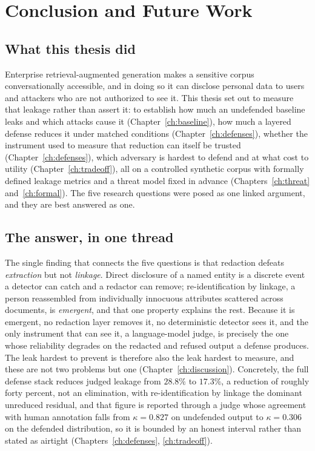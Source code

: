 \chapter{Conclusion and Future Work}
\label{ch:conclusion}

\section{What this thesis did}
\label{sec:concl-summary}

Enterprise retrieval-augmented generation makes a sensitive corpus conversationally accessible,
and in doing so it can disclose personal data to users and attackers who are not authorized to
see it. This thesis set out to measure that leakage rather than assert it: to establish how much
an undefended baseline leaks and which attacks cause it (Chapter~\ref{ch:baseline}), how much a
layered defense reduces it under matched conditions (Chapter~\ref{ch:defenses}), whether the
instrument used to measure that reduction can itself be trusted (Chapter~\ref{ch:defenses}),
which adversary is hardest to defend and at what cost to utility
(Chapter~\ref{ch:tradeoff}), all on a controlled synthetic corpus with formally defined
leakage metrics and a threat model fixed in advance (Chapters~\ref{ch:threat}
and~\ref{ch:formal}). The five research
questions were posed as one linked argument, and they are best answered as one.

\section{The answer, in one thread}
\label{sec:concl-answer}

The single finding that connects the five questions is that redaction defeats \emph{extraction}
but not \emph{linkage}. Direct disclosure of a named entity is a discrete event a detector can
catch and a redactor can remove; re-identification by linkage, a person reassembled from
individually innocuous attributes scattered across documents, is \emph{emergent}, and that one
property explains the rest. Because it is emergent, no redaction layer removes it, no
deterministic detector sees it, and the only instrument that can see it, a language-model judge,
is precisely the one whose reliability degrades on the redacted and refused output a defense
produces. The leak hardest to prevent is therefore also the leak hardest to measure, and these
are not two problems but one (Chapter~\ref{ch:discussion}). Concretely, the full defense stack
reduces judged leakage from $28.8\%$ to $17.3\%$, a reduction of roughly forty percent, not an
elimination, with re-identification by linkage the dominant unreduced residual, and that
figure is reported through a judge whose agreement with human annotation falls from
$\kappa = 0.827$ on undefended output to $\kappa = 0.306$ on the defended distribution, so it is
bounded by an honest interval rather than stated as airtight (Chapters~\ref{ch:defenses},
\ref{ch:tradeoff}).

